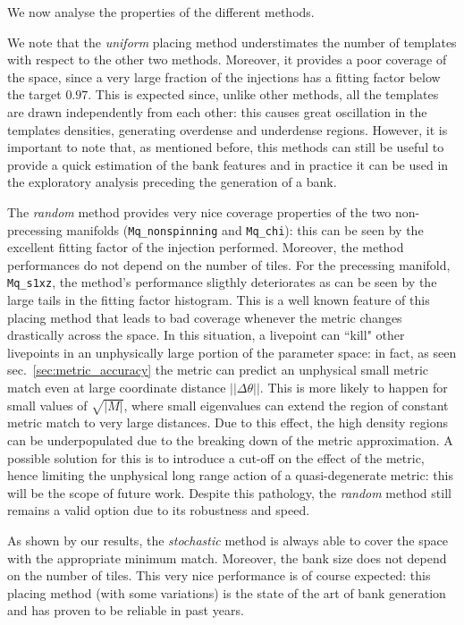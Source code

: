 \documentclass[twocolumn,showpacs,preprintnumbers,nofootinbib,prd,
superscriptaddress,10pt]{revtex4-2}
\begin{document}
We now analyse the properties of the different methods.

We note that the {\it uniform} placing method understimates the number of templates with respect to the other two methods. Moreover, it provides a poor coverage of the space, since a very large fraction of the injections has a fitting factor below the target $0.97$. This is expected since, unlike other methods, all the templates are drawn independently from each other: this causes great oscillation in the templates densities, generating overdense and underdense regions.
However, it is important to note that, as mentioned before, this methods can still be useful to provide a quick estimation of the bank features and in practice it can be used in the exploratory analysis preceding the generation of a bank.

The {\it random} method provides very nice coverage properties of the two non-precessing manifolds (\texttt{Mq\_nonspinning} and \texttt{Mq\_chi}): this can be seen by the excellent fitting factor of the injection performed. Moreover, the method performances do not depend on the number of tiles.
For the precessing manifold, \texttt{Mq\_s1xz}, the method's performance sligthly deteriorates as can be seen by the large tails in the fitting factor histogram.
This is a well known feature of this placing method that leads to bad coverage whenever the metric changes drastically across the space. In this situation, a livepoint can ``kill" other livepoints in an unphysically large portion of the parameter space: in fact, as seen sec.~\ref{sec:metric_accuracy} the metric can predict an unphysical small metric match even at large coordinate distance $||\Delta\theta||$. This is more likely to happen for small values of $\sqrt{|M|}$, where small eigenvalues can extend the region of constant metric match to very large distances.
Due to this effect, the high density regions can be underpopulated due to the breaking down of the metric approximation. A possible solution for this is to introduce a cut-off on the effect of the metric, hence limiting the unphysical long range action of a quasi-degenerate metric: this will be the scope of future work.
Despite this pathology, the {\it random} method still remains a valid option due to its robustness and speed.

As shown by our results, the {\it stochastic} method is always able to cover the space with the appropriate minimum match. Moreover, the bank size does not depend on the number of tiles. This very nice performance is of course expected: this placing method (with some variations) is the state of the art of bank generation and has proven to be reliable in past years.
\end{document}
